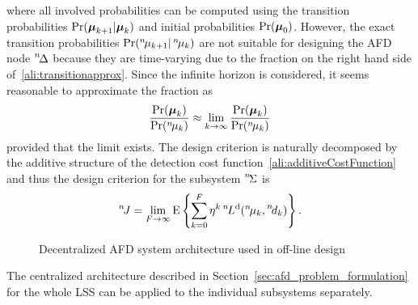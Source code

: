 \documentclass[conference,letterpaper]{IEEEtran}
\def\ist{\prescript{1\!}{}}
\def\iind{\prescript{2\!}{}}
\def\iiird{\prescript{3\!}{}}
\def\nth{\prescript{n\!}{}}
\begin{document}
where all involved probabilities can be computed using the transition probabilities $\Pr(\boldsymbol{\mu}_{k+1}|\boldsymbol{\mu}_k)$ and initial probabilities $\Pr(\boldsymbol{\mu}_{0})$. 
However, the exact transition probabilities  $\Pr(\nth{\mu}_{k+1}|\nth{\mu}_k)$ are not suitable for designing the AFD node $\nth{\Delta}$ because they are time-varying due to the fraction on the right hand side of~\eqref{ali:transitionapprox}. 
Since the infinite horizon is considered, it seems reasonable to approximate the fraction as
\begin{align}
	\label{ali:coupling_ignorance}
	\frac{\Pr(\bfmu_k)}{\Pr(\nth{\mu}_k)}\approx \lim_{k\to\infty} \frac{\Pr(\bfmu_k)}{\Pr(\nth{\mu}_k)}
\end{align}
provided that the limit exists. 
The design criterion is naturally decomposed by the additive structure of the detection cost function~\eqref{ali:additiveCostFunction} and thus the design criterion for the subsystem $\nth{\Sigma}$ is
\begin{align}
	\nth{J} = \lim_{F\to\infty} \mean \left\{ \sum_{k=0}^{F} \eta^{k} \nth{L}^{\mathrm{d}}(\nth{\mu}_{k},\nth{d}_{k})\right\}.
\end{align}
\begin{figure}[ht]
  \centering
  \caption{Decentralized AFD system architecture used in off-line design}\label{fig:DeAFD}
\end{figure}
The centralized architecture described in Section~\ref{sec:afd_problem_formulation} for the whole LSS can be applied to the individual subsystems separately. 
\end{document}
